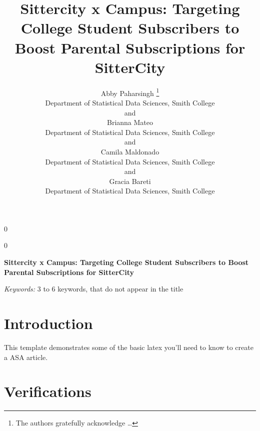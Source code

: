 \documentclass[12pt]{article}
\newcommand{\blind}{0}
\begin{document}
\def\spacingset#1{\renewcommand{\baselinestretch}%
{#1}\small\normalsize} \spacingset{1}



\blind
{
  \title{\bf Sittercity x Campus: Targeting College Student Subscribers
to Boost Parental Subscriptions for SitterCity}

  \author{
        Abby Paharsingh \thanks{The authors gratefully acknowledge
\ldots{}} \\
    Department of Statistical Data Sciences, Smith College\\
     and \\     Brianna Mateo \\
    Department of Statistical Data Sciences, Smith College\\
     and \\     Camila Maldonado \\
    Department of Statistical Data Sciences, Smith College\\
     and \\     Gracia Bareti \\
    Department of Statistical Data Sciences, Smith College\\
      }
  \maketitle
} \fi

\blind
{
  \bigskip
  \bigskip
  \bigskip
  \begin{center}
    {\LARGE\bf Sittercity x Campus: Targeting College Student
Subscribers to Boost Parental Subscriptions for SitterCity}
  \end{center}
  \medskip
} \fi

\bigskip

\noindent%
{\it Keywords:} 3 to 6 keywords, that do not appear in the title

\vfill

\newpage
\spacingset{1.9} %

\hypertarget{introduction}{%
\section{Introduction}\label{introduction}}

This template demonstrates some of the basic latex you'll need to know
to create a ASA article.

\section{Verifications}
\label{sec:verify}
\end{document}
